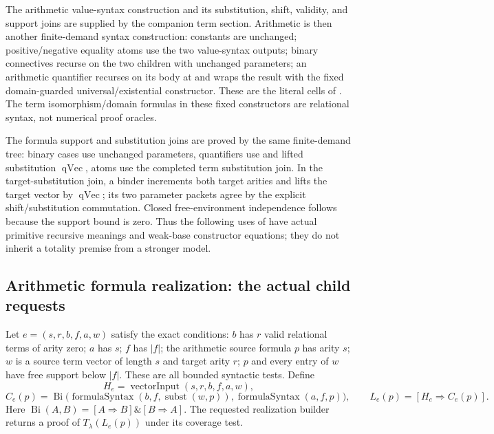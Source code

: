 The arithmetic value-syntax construction and its substitution,
shift, validity, and support joins are supplied by the companion
term section.  Arithmetic  is then another
finite-demand syntax construction: constants are unchanged;
positive/negative equality atoms use the two value-syntax outputs;
binary connectives recurse on the two children with unchanged
parameters; an arithmetic quantifier recurses on its body at
 and wraps the result with the fixed
domain-guarded universal/existential constructor.  These are the
literal cells of
.
The term isomorphism/domain formulas in these fixed constructors
are relational syntax, not numerical proof oracles.

The formula support and substitution joins are proved by the same
finite-demand tree: binary cases use unchanged parameters,
quantifiers use  and lifted substitution
$\operatorname{qVec}$, atoms use the completed term substitution
join.  In the target-substitution join, a binder increments both
target arities and lifts the target vector by $\operatorname{qVec}$;
its two parameter packets agree by the explicit shift/substitution
commutation.  Closed free-environment independence follows because
the support bound is zero.  Thus the following uses of
 have actual primitive recursive meanings and
weak-base constructor equations; they do not inherit a
 totality premise from a stronger model.

\subsection{Arithmetic formula realization: the actual child requests}

Let $e=(s,r,b,f,a,w)$ satisfy the exact
 conditions: $b$ has $r$ valid relational
terms of arity zero; $a$ has $s$; $f$ has $|f|$; the arithmetic source
formula $p$ has arity $s$; $w$ is a source term vector of length $s$
and target arity $r$; $p$ and every entry of $w$ have free support
below $|f|$.  These are all bounded syntactic tests.  Define
\[
 H_e=\operatorname{vectorInput}(s,r,b,f,a,w),
\]
\[
 C_e(p)=\operatorname{Bi}\bigl(
 \operatorname{formulaSyntax}(b,f,\operatorname{subst}(w,p)),
 \operatorname{formulaSyntax}(a,f,p)\bigr),\qquad
 L_e(p)=[H_e\Rightarrow C_e(p)].
\]
Here $\operatorname{Bi}(A,B)=[A\Rightarrow B]\mathbin\&[B\Rightarrow A]$.
The requested realization builder returns a proof of
$T_\lambda(L_e(p))$ under its coverage test.

